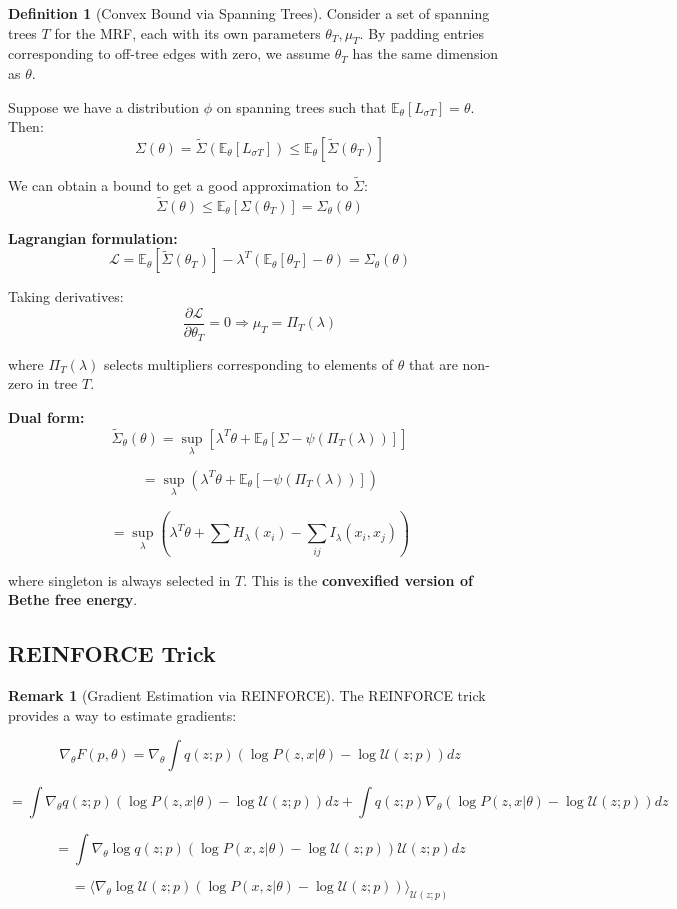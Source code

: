 \documentclass[12pt,a4paper]{article}
\theoremstyle{definition}
\newtheorem{definition}{Definition}[section]
\newtheorem{remark}{Remark}[section]
\begin{document}
\begin{definition}[Convex Bound via Spanning Trees]
Consider a set of spanning trees $T$ for the MRF, each with its own parameters $\theta_T, \mu_T$. By padding entries corresponding to off-tree edges with zero, we assume $\theta_T$ has the same dimension as $\theta$.

Suppose we have a distribution $\phi$ on spanning trees such that $\mathbb{E}_\theta[L_{\sigma T}] = \theta$. Then:
\[
\Sigma(\theta) = \tilde{\Sigma}(\mathbb{E}_\theta[L_{\sigma T}]) \leq \mathbb{E}_\theta[\tilde{\Sigma}(\theta_T)]
\]

We can obtain a bound to get a good approximation to $\tilde{\Sigma}$:
\[
\tilde{\Sigma}(\theta) \leq \mathbb{E}_\theta[\Sigma(\theta_T)] = \Sigma_\theta(\theta)
\]

\textbf{Lagrangian formulation:}
\[
\mathcal{L} = \mathbb{E}_\theta[\tilde{\Sigma}(\theta_T)] - \lambda^T (\mathbb{E}_\theta[\theta_T] - \theta) = \Sigma_\theta(\theta)
\]

Taking derivatives:
\[
\frac{\partial \mathcal{L}}{\partial \theta_T} = 0 \Rightarrow \mu_T = \Pi_T(\lambda)
\]

where $\Pi_T(\lambda)$ selects multipliers corresponding to elements of $\theta$ that are non-zero in tree $T$.

\textbf{Dual form:}
\[
\tilde{\Sigma}_\theta(\theta) = \sup_\lambda \left[ \lambda^T \theta + \mathbb{E}_\theta[\Sigma - \psi(\Pi_T(\lambda))] \right]
\]

\[
= \sup_\lambda \left( \lambda^T \theta + \mathbb{E}_\theta[-\psi(\Pi_T(\lambda))] \right)
\]

\[
= \sup_\lambda \left( \lambda^T \theta + \sum H_\lambda(x_i) - \sum_{ij} I_\lambda(x_i, x_j) \right)
\]

where singleton is always selected in $T$. This is the \textbf{convexified version of Bethe free energy}.
\end{definition}

\subsection{REINFORCE Trick}

\begin{remark}[Gradient Estimation via REINFORCE]
The REINFORCE trick provides a way to estimate gradients:

\[
\nabla_\theta F(p, \theta) = \nabla_\theta \int q(z;p) (\log P(z, x|\theta) - \log \mathcal{U}(z;p)) dz
\]

\[
= \int \nabla_\theta q(z;p) (\log P(z, x|\theta) - \log \mathcal{U}(z;p)) dz + \int q(z;p) \nabla_\theta (\log P(z, x|\theta) - \log \mathcal{U}(z;p)) dz
\]

\[
= \int \nabla_\theta \log q(z;p) (\log P(x, z|\theta) - \log \mathcal{U}(z;p)) \mathcal{U}(z;p) dz
\]

\[
= \langle \nabla_\theta \log \mathcal{U}(z;p) (\log P(x, z|\theta) - \log \mathcal{U}(z;p)) \rangle_{\mathcal{U}(z;p)}
\]
\end{remark}
\end{document}
